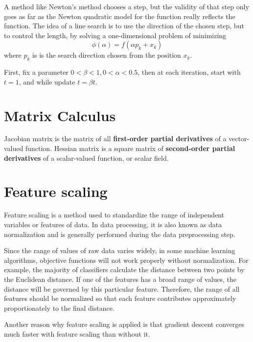  A method like Newton's method chooses a step, but the validity of that step only goes as far as the Newton quadratic model for the function really reflects the function. The idea of a line search is to use the direction of the chosen step, but to control the length, by solving a one-dimensional problem of minimizing
\[
\phi(\alpha) = f(\alpha p_k + x_k)
\]
where $p_k$ is is the search direction chosen from the position $x_k$.

First, fix a parameter $0 < \beta < 1, 0 < \alpha < 0.5$, then at each iteration, start with $t = 1$, and while 
update $t = \beta t$. 


\section{Matrix Calculus}

Jacobian matrix is the matrix of all \textbf{first-order partial derivatives} of a vector-valued function.
Hessian matrix is a square matrix of \textbf{second-order partial derivatives} of a scalar-valued function, or scalar field.

\section{Feature scaling}
Feature scaling is a method used to standardize the range of independent variables or features of data. In data processing, it is also known as data normalization and is generally performed during the data preprocessing step.


Since the range of values of raw data varies widely, in some machine learning algorithms, objective functions will not work properly without normalization. For example, the majority of classifiers calculate the distance between two points by the Euclidean distance. If one of the features has a broad range of values, the distance will be governed by this particular feature. Therefore, the range of all features should be normalized so that each feature contributes approximately proportionately to the final distance.

Another reason why feature scaling is applied is that gradient descent converges much faster with feature scaling than without it.























